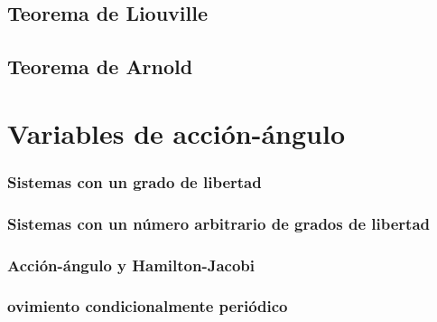 \subsection{Teorema de Liouville}
\subsection{Teorema de Arnold}
\section{Variables de acción-ángulo}
\subsubsection{Sistemas con un grado de libertad}
\subsubsection{Sistemas con un número arbitrario de grados de libertad}
\subsubsection{Acción-ángulo y Hamilton-Jacobi}
\subsubsection{ovimiento condicionalmente periódico}
